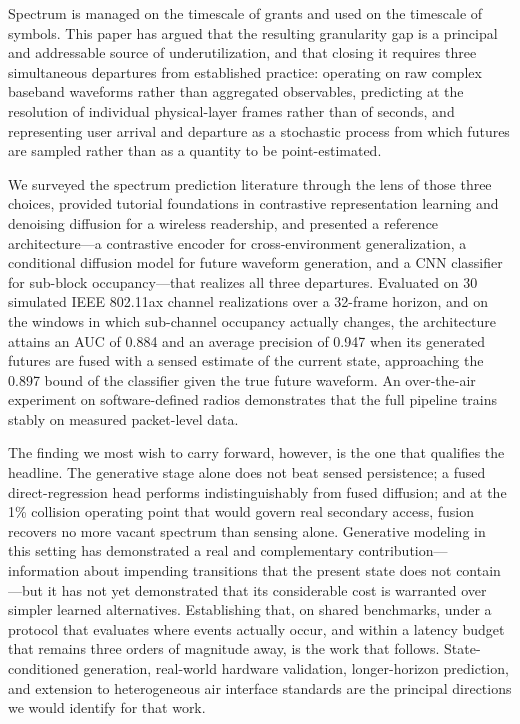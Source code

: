 \documentclass[lettersize,journal]{IEEEtran}
\begin{document}
Spectrum is managed on the timescale of grants and used on the timescale
of symbols. This paper has argued that the resulting granularity gap is a
principal and addressable source of underutilization, and that closing it
requires three simultaneous departures from established practice:
operating on raw complex baseband waveforms rather than aggregated
observables, predicting at the resolution of individual physical-layer
frames rather than of seconds, and representing user arrival and
departure as a stochastic process from which futures are sampled rather
than as a quantity to be point-estimated.

We surveyed the spectrum prediction literature through the lens of those
three choices, provided tutorial foundations in contrastive
representation learning and denoising diffusion for a wireless
readership, and presented a reference architecture---a contrastive
encoder for cross-environment generalization, a conditional diffusion model
for future waveform generation, and a CNN classifier for sub-block
occupancy---that realizes all three departures. Evaluated on 30 simulated
IEEE 802.11ax channel realizations over a 32-frame horizon, and on the windows
in which sub-channel occupancy actually changes, the architecture attains an AUC
of 0.884 and an average precision of 0.947 when its generated futures
are fused with a sensed estimate of the current state, approaching the
0.897 bound of the classifier given the true future waveform. An
over-the-air experiment on software-defined radios demonstrates that the
full pipeline trains stably on measured packet-level data.

The finding we most wish to carry forward, however, is the one that
qualifies the headline. The generative stage alone does not beat sensed
persistence; a fused direct-regression head performs
indistinguishably from fused diffusion; and at the 1\% collision
operating point that would govern real secondary access, fusion recovers
no more vacant spectrum than sensing alone. Generative modeling in this
setting has demonstrated a real and complementary contribution---
information about impending transitions that the present state does not
contain---but it has not yet demonstrated that its considerable cost is
warranted over simpler learned alternatives. Establishing that, on
shared benchmarks, under a protocol that evaluates where events actually
occur, and within a latency budget that remains three orders of
magnitude away, is the work that follows. State-conditioned generation,
real-world hardware validation, longer-horizon prediction, and extension to
heterogeneous air interface standards are the principal directions we would
identify for that work.
\end{document}
